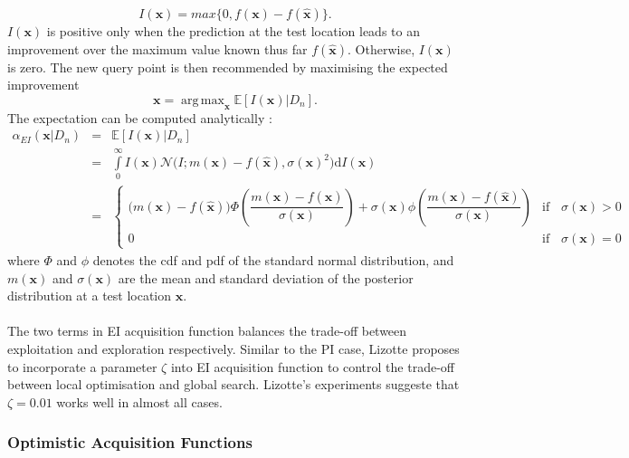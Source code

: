\documentclass[a4paper,11pt]{report}
\DeclareMathOperator*{\argmax}{arg\,max}
\begin{document}
\begin{equation}
	I(\mathbf{x})=max\{ 0, f(\mathbf{x})-f(\mathbf{\hat{x}})\}.
\end{equation}
$ I(\mathbf{x}) $ is positive only when the prediction at the test location leads to an improvement over the maximum value known thus far $f(\mathbf{\hat{x}})$. Otherwise, $ I(\mathbf{x}) $ is zero. The new query point is then recommended by maximising the expected improvement 
   	\begin{equation}
	\mathbf{x}=\argmax_\mathbf{x} \mathbb{E} [ I(\mathbf{x}) \vert D_n  ].
	\end{equation}
The expectation can be computed analytically \cite{dixon1978towards}:
\begin{eqnarray*} 
\alpha_{EI}(\mathbf{x} \vert D_n) &= & \mathbb{E} [ I(\mathbf{x}) \vert D_n  ]
	\\ &=& \int\limits_{0}^{\infty} I(\mathbf{x}) \mathcal{N} \big(I; m (\mathbf{x})-f(\mathbf{\hat{x}}), \sigma(\mathbf{x})^2 \big) \mathrm{d} I(\mathbf{x}) 
	\\ & = & 
\begin{cases}
	\big(m({\mathbf{x}})-f(\mathbf{\hat{x}})\big) \Phi \left( \dfrac {m(\mathbf{x})-f(\mathbf{\hat{x}})}{\sigma({\mathbf{x}})} \right) + \sigma(\mathbf{x}) \phi \left( \dfrac {m(\mathbf{x})-f(\mathbf{\hat{x}})}{\sigma({\mathbf{x}})} \right) & \text{if}  \hspace{11pt} \sigma(\mathbf{x}) > 0 \\
	0				    & \text{if} \hspace{11pt}  \sigma(\mathbf{x}) = 0
\end{cases}	
\end{eqnarray*}
\noindent
where $\Phi$ and  $\phi$ denotes the cdf and pdf of the standard normal distribution, and $m(\mathbf{x})$ and $\sigma(\mathbf{x})$ are the mean and standard deviation of the posterior distribution at a test location $\mathbf{x}$. 
\\\\
The two terms in EI acquisition function balances the trade-off between exploitation and exploration respectively. Similar to the PI case, Lizotte \cite{lizotte2008practical}  proposes to incorporate a parameter $\zeta$ into EI acquisition function to control the trade-off between local optimisation and global search. Lizotte's experiments suggeste that $\zeta=0.01$ works well in almost all cases. 

\subsubsection{Optimistic Acquisition Functions}
\end{document}
